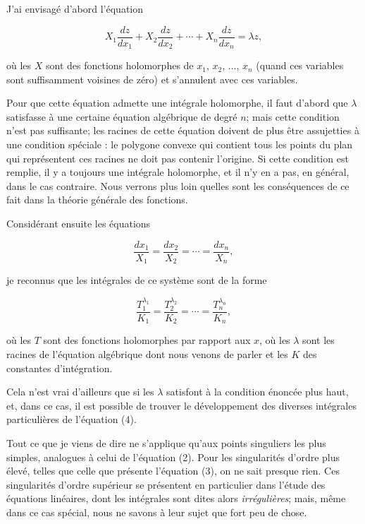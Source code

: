 \documentclass[11pt]{article}
\begin{document}
J’ai envisagé d’abord l’équation

\begin{equation}
X_1\frac{dz}{dx_1}+X_2\frac{dz}{dx_2}+\cdots+X_n\frac{dz}{dx_n}=\lambda z,
\end{equation}

où les $X$ sont des fonctions holomorphes de $x_1$, $x_2$, ..., $x_n$ (quand ces variables sont suffisamment voisines de zéro) et s’annulent avec ces variables.

Pour que cette équation admette une intégrale holomorphe, il faut d’abord que $\lambda$ satisfasse à une certaine équation algébrique de degré $n$; mais cette condition n’est pas suffisante; les racines de cette équation doivent de plus être assujetties à une condition spéciale : le polygone convexe qui contient tous les points du plan qui représentent ces racines ne doit pas contenir l’origine. Si cette condition est remplie, il y a toujours une intégrale holomorphe, et il n’y en a pas, en général, dans le cas contraire. Nous verrons plus loin quelles sont les conséquences de ce fait dans la théorie générale des fonctions.

Considérant ensuite les équations

\[
\frac{dx_1}{X_1}=\frac{dx_2}{X_2}=\cdots=\frac{dx_n}{X_n},
\]

je reconnus que les intégrales de ce système sont de la forme

\[
\frac{T_1^{\lambda_1}}{K_1}=\frac{T_2^{\lambda_2}}{K_2}=\cdots=\frac{T_n^{\lambda_n}}{K_n},
\]

où les $T$ sont des fonctions holomorphes par rapport aux $x$, où les $\lambda$ sont les racines de l’équation algébrique dont nous venons de parler et les $K$ des constantes d’intégration.

Cela n’est vrai d’ailleurs que si les $\lambda$ satisfont à la condition énoncée plus haut, et, dans ce cas, il est possible de trouver le développement des diverses intégrales particulières de l’équation (4).

Tout ce que je viens de dire ne s’applique qu’aux points singuliers les plus simples, analogues à celui de l’équation (2). Pour les singularités d’ordre plus élevé, telles que celle que présente l’équation (3), on ne sait presque rien. Ces singularités d’ordre supérieur se présentent en particulier dans l’étude des équations linéaires, dont les intégrales sont dites alors \emph{irrégulières}; mais, même dans ce cas spécial, nous ne savons à leur sujet que fort peu de chose.
\end{document}
